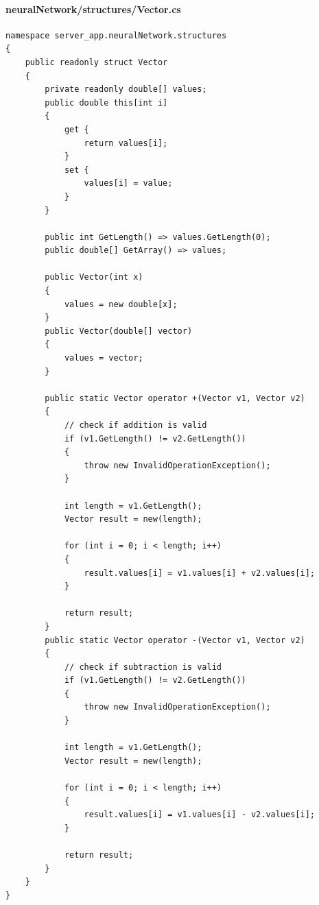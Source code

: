 \documentclass{article}
\begin{document}
\paragraph{neuralNetwork/structures/Vector.cs}\label{server/neuralnetwork/structures/vector.cs}
\begin{verbatim}
namespace server_app.neuralNetwork.structures
{
	public readonly struct Vector
	{
		private readonly double[] values;
		public double this[int i]
		{
			get {
				return values[i];
			}
			set {
				values[i] = value;
			}
		}

		public int GetLength() => values.GetLength(0);
		public double[] GetArray() => values;

		public Vector(int x)
		{
			values = new double[x];
		}
		public Vector(double[] vector)
		{
			values = vector;
		}

		public static Vector operator +(Vector v1, Vector v2)
		{
			// check if addition is valid
			if (v1.GetLength() != v2.GetLength())
			{
				throw new InvalidOperationException();
			}

			int length = v1.GetLength();
			Vector result = new(length);

			for (int i = 0; i < length; i++)
			{
				result.values[i] = v1.values[i] + v2.values[i];
			}

			return result;
		}
		public static Vector operator -(Vector v1, Vector v2)
		{
			// check if subtraction is valid
			if (v1.GetLength() != v2.GetLength())
			{
				throw new InvalidOperationException();
			}

			int length = v1.GetLength();
			Vector result = new(length);

			for (int i = 0; i < length; i++)
			{
				result.values[i] = v1.values[i] - v2.values[i];
			}

			return result;
		}
	}
}
\end{verbatim}
\end{document}
